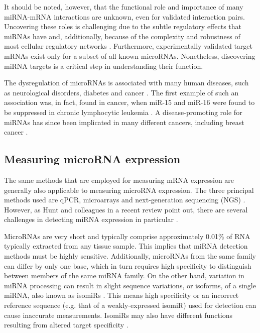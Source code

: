 
It should be noted, however, that the functional role and importance of many
miRNA-mRNA interactions are unknown, even for validated interaction pairs.
Uncovering these roles is challenging due to the subtle regulatory effects
that miRNAs have and, additionally, because of the complexity and
robustness of most cellular regulatory networks \citep{Bartel2009}.
Furthermore, experimentally validated target mRNAs exist only for a subset of
all known microRNAs. Nonetheless, discovering miRNA targets is a critical
step in understanding their function.

The dysregulation of microRNAs is associated with many human diseases,
such as neurological disorders, diabetes and cancer \citep{Jiang2009}. 
The first example of such an association was, in fact, found in cancer, when
miR-15 and miR-16 were found to be suppressed in chronic lymphocytic leukemia
\citep{Musilova2015}. A disease-promoting role for miRNAs has since been
implicated in many different cancers, including breast cancer
\citep{Melo2011}.




\subsection{Measuring microRNA expression}

The same methods that are employed for measuring mRNA expression are generally
also applicable to measuring microRNA expression. The three principal methods
used are qPCR, microarrays and next-generation sequencing (NGS)
\citep{Huang2011}. However, as Hunt and colleagues in a recent review point
out, there are several challenges in detecting miRNA expression in particular
\citep{Hunt2015}.

MicroRNAs are very short and typically comprise approximately 0.01\% of RNA
typically extracted from any tissue sample. This implies that
miRNA detection methods must be highly sensitive. Additionally, microRNAs from
the same family can differ by only one base, which in turn requires high
specificity to distinguish between members of the same miRNA family. On the
other hand, variation in miRNA processing can result in slight sequence
variations, or isoforms, of a single miRNA, also known as isomiRs
\citep{Lee2010}. This means high specificity or an incorrect
reference sequence (e.g. that of a weakly-expressed isomiR) used for detection
can cause inaccurate measurements. IsomiRs may also have different functions
resulting from altered target specificity \citep{Chugh2012}.

